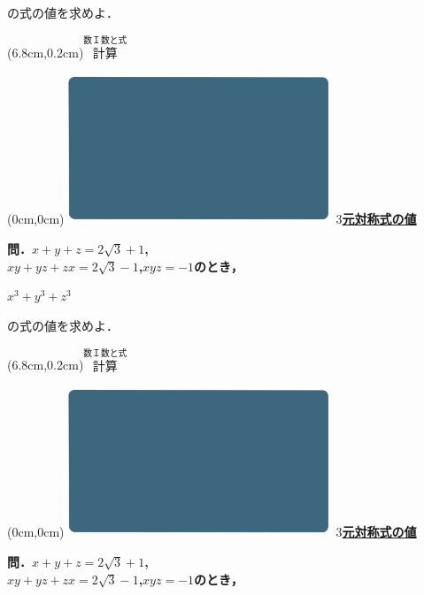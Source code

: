 \documentclass[10pt,
fleqn,
dvipdfmx,
uplatex
]{jsarticle}
\begin{document}
\large
\hfill の式の値を求めよ．

\at(6.8cm,0.2cm){\small\color{bradorange}$\overset{\text{数Ｉ数と式}}{\text{計算}}$}

\newpage

\at(0cm,0cm){\includegraphics[width=8cm,bb=0 0 1920 1080]{./youtube/thumbnails/templates/smart_background/数I数と式.jpeg}}
{\color{orange}\bf\boldmath\huge\underline{$3$元対称式の値}}\vspace{0.3zw}

\normalsize
\bf\boldmath 問．$x+y+z=2\sqrt 3+1$,\;\\
\hfill $xy+yz+zx=2\sqrt 3-1$,\;$xyz=-1$のとき，

\fontsize{35}{0} \selectfont
\vspace{0.1zw}
\hspace{0.1zw} $x^3+y^3+z^3$
\vspace{0.05zw}

\large
\hfill の式の値を求めよ．

\at(6.8cm,0.2cm){\small\color{bradorange}$\overset{\text{数Ｉ数と式}}{\text{計算}}$}

\newpage

\at(0cm,0cm){\includegraphics[width=8cm,bb=0 0 1920 1080]{./youtube/thumbnails/templates/smart_background/数I数と式.jpeg}}
{\color{orange}\bf\boldmath\huge\underline{$3$元対称式の値}}\vspace{0.3zw}

\normalsize
\bf\boldmath 問．$x+y+z=2\sqrt 3+1$,\;\\
\hfill $xy+yz+zx=2\sqrt 3-1$,\;$xyz=-1$のとき，
\end{document}
